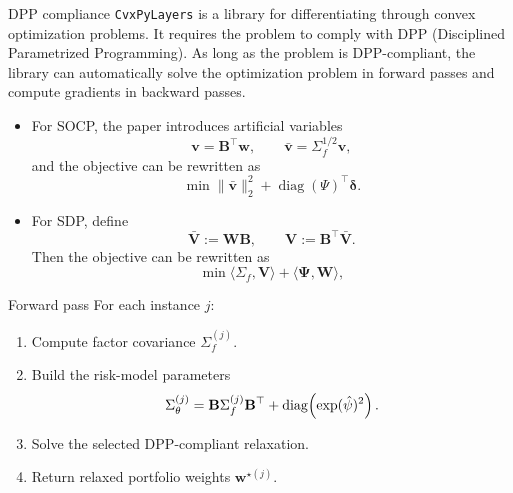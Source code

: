 \documentclass[10pt,aspectratio=169]{beamer}
\newcommand{\Param}{\theta}
\newcommand{\SigmaMat}{\Sigma}
\newcommand{\diagv}{\operatorname{diag}}
\begin{document}
\begin{frame}{DPP compliance}
  \footnotesize
  \texttt{CvxPyLayers} is a library for differentiating through convex optimization problems. It requires the problem to comply with DPP (Disciplined Parametrized Programming). As long as the problem is DPP-compliant, the library can automatically solve the optimization problem in forward passes and compute gradients in backward passes.
  \begin{itemize}
    \item For SOCP, the paper introduces artificial variables
  \[
    \mathbf{v} = \mathbf{B}^\top \mathbf{w},\qquad
    \bar{\mathbf{v}} = \SigmaMat_f^{1/2}\mathbf{v},
  \]
  and the objective can be rewritten as 
  \[ \min \|\bar{\mathbf{v}}\|_2^2 + \diagv(\Psi)^\top\boldsymbol{\delta}.\]

  \item For SDP, define 
  \[
    \mathbf{\bar{V}} := \mathbf{W} \mathbf{B}, \qquad \mathbf{V} := \mathbf{B}^\top \mathbf{\bar{V}}.
    \]  
    Then the objective can be rewritten as 
    \[ \min \langle \SigmaMat_f, \mathbf{V} \rangle + \langle \boldsymbol{\Psi}, \mathbf{W} \rangle,\]
  \end{itemize}

\end{frame}

\begin{frame}{Forward pass}
    \small 
  For each instance $j$:
  \begin{enumerate}
    \item Compute factor covariance $\SigmaMat_f^{(j)}$.
    \item Build the risk-model parameters
    \[
      \SigmaMat_\Param^{(j)}
      =
      \mathbf{B}\SigmaMat_f^{(j)}\mathbf{B}^\top
      +
      \diag\!\left(\exp(\hat\psi)^2\right).
    \]
    \item Solve the selected DPP-compliant relaxation.
    \item Return relaxed portfolio weights $\mathbf w^{\star(j)}$.
  \end{enumerate}

\end{frame}
\end{document}
